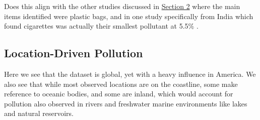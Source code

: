 \documentclass[10pt]{article}\usepackage[]{graphicx}\usepackage[]{color}
\begin{document}
Does this align with the other studies discussed in \hyperref[research]{Section 2} where the main items identified were plastic bags, and in one study specifically from India which found cigarettes was actually their smallest pollutant at 5.5\% \cite{KUMAR2016}. 




\pagebreak
\subsection{Location-Driven Pollution}

Here we see that the dataset is global, yet with a heavy influence in America. We also see that while most observed locations are on the coastline, some make reference to oceanic bodies, and some are inland, which would account for pollution also observed in rivers and freshwater marine environments like lakes and natural reservoirs.
\end{document}
